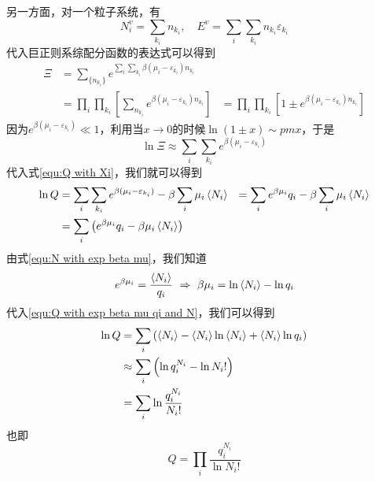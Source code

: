 另一方面，对一个粒子系统，有\begin{equation}
    N_i^v =\sum_{k_i} n_{k_i},\quad E^v=\sum_i\sum_{k_i}n_{k_i} \varepsilon_{k_i}
\end{equation}
代入巨正则系综配分函数的表达式可以得到\begin{equation}
   \begin{aligned}
    \Xi &=\sum_{\{n_{k_i}\}} e^{\sum_i\sum_{k_i}\beta(\mu_i-\varepsilon_{k_i})n_{k_i} } \\
    & = \prod_i \prod_{k_i} \left[\sum_{n_{k_i} }e^{\beta(\mu_i-\varepsilon_{k_i})n_{k_i} }\right]
    &= \prod_i \prod_{k_i} \left[1\pm e^{\beta(\mu_i-\varepsilon_{k_i})n_{k_i} }\right]
   \end{aligned}
\end{equation}
因为$e^{\beta (\mu_i -\varepsilon_{k_i})}\ll1$，利用当$x\to 0$的时候$\ln (1\pm x)\sim pm x$，于是\begin{equation}
    \ln \Xi \approx \sum_i \sum_{k_i} e^{\beta(\mu_i-\varepsilon_{k_i})}
\end{equation}
代入式\ref{equ:Q with Xi}，我们就可以得到\begin{equation}
\begin{aligned}
    \ln Q &= \sum_i \sum_{k_i} e^{\beta(\mu_i-\varepsilon_{k_i})}- \beta \sum_i \mu_i\braket{N_i}
    &=\sum_i e^{\beta \mu_i} q_i - \beta \sum_i \mu_i\braket{N_i}\\
    &=\sum_i \left(e^{\beta \mu_i} q_i -\beta \mu_i\braket{N_i}\right)
    \label{equ:Q with exp beta mu qi and N}
\end{aligned}
\end{equation}
由式\ref{equ:N with exp beta mu}，我们知道\begin{equation}
    e^{\beta \mu_i}=\frac{\braket{N_i}}{q_i}\ \Rightarrow \  \beta \mu_i =\ln\braket{N_i} -\ln q_i
\end{equation}
代入\ref{equ:Q with exp beta mu qi and N}，我们可以得到\begin{equation}
    \begin{aligned}
        \ln Q &=\sum_i \left(\braket{N_i} -\braket{N_i}\ln \braket{N_i} +\braket{N_i}\ln q_i\right)\\
        & \approx \sum_i \left(\ln q_i^{N_i}-\ln N_i!\right)\\
        &=\sum_i \ln \frac{q_i^{N_i}}{N_i!}
    \end{aligned}
\end{equation}
也即\begin{equation}
    Q =\prod_i \frac{q_i^{N_i}}{ \ln N_i!}
\end{equation}

